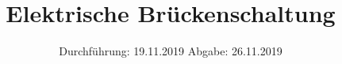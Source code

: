 

\subject{V302}
\title{Elektrische Brückenschaltung}
\date{%
  Durchführung: 19.11.2019
  \hspace{3em}
  Abgabe: 26.11.2019
}



\maketitle
\thispagestyle{empty}
\tableofcontents
\newpage







\printbibliography{}


